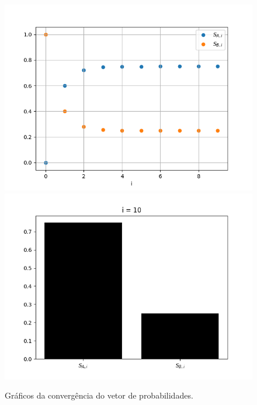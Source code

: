 \documentclass[12pt]{article}
\begin{document}
\begin{figure}[H]
\centering
\includegraphics[scale=0.55]{graph1.png}
\includegraphics[scale=0.55]{graph2.png}
\caption{Gráficos da convergência do vetor de probabilidades.}
\end{figure}
\end{document}
